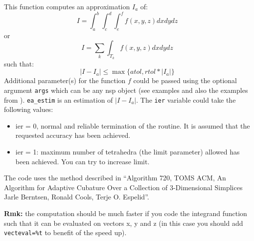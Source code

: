 \begin{mandescription}
This function computes an approximation $I_a$ of:
$$
   I = \int_a^b \int_c^d \int_e^f f(x,y,z) dxdydz
$$
or
$$
   I = \sum_k \int_{T_k} f(x,y,z) dxdydz
$$
such that:
$$
   | I - I_a | \le  \max \{ atol ,  rtol*|I_a| \}
$$
Additional parameter(s) for the function $f$ could be passed using the
optional argument \verb+args+ which can be any nsp object (see
examples and also the examples from ). 
\verb+ea_estim+ is an estimation of $| I - I_a |$. The
\verb+ier+ variable could take the following values: 
\begin{itemize}
\item ier = 0,  normal and reliable termination of the routine. It is assumed that the
      requested  accuracy has been achieved.
\item ier = 1: maximum number of tetrahedra (the limit
      parameter) allowed has been achieved. You can try to
      increase limit.
\end{itemize}
 
The code uses the method described in ``Algorithm 720, TOMS ACM,
An Algorithm for Adaptive Cubature Over a Collection of 3-Dimensional Simplices
Jarle Berntsen, Ronald Cools, Terje O. Espelid''.

{\bf Rmk:} the computation should be much faster if you code the integrand function
such that it can be evaluated on vectors x, y and z (in this case you should add \verb+vecteval=%t+
to benefit of the speed up).

\end{mandescription}

